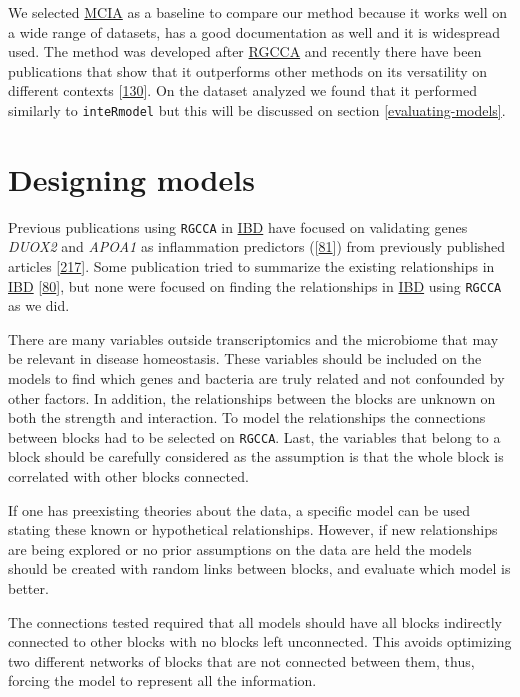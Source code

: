 \documentclass[
  12pt,
  a4paper,
  twoside,
  openright]{book}
\begin{document}
We selected \protect\hyperlink{acronyms_MCIA}{MCIA} as a baseline to compare our method because it works well on a wide range of datasets, has a good documentation as well and it is widespread used.
The method was developed after \protect\hyperlink{acronyms_RGCCA}{RGCCA} and recently there have been publications that show that it outperforms other methods on its versatility on different contexts {[}\protect\hyperlink{ref-cantini2021}{130}{]}.
On the dataset analyzed we found that it performed similarly to \texttt{inteRmodel} but this will be discussed on section \ref{evaluating-models}.

\hypertarget{designing-models}{%
\section{Designing models}\label{designing-models}}

Previous publications using \texttt{RGCCA} in \protect\hyperlink{acronyms_IBD}{IBD} have focused on validating genes \emph{DUOX2} and \emph{APOA1} as inflammation predictors ({[}\protect\hyperlink{ref-tang2017}{81}{]}) from previously published articles {[}\protect\hyperlink{ref-haberman2014}{217}{]}.
Some publication tried to summarize the existing relationships in \protect\hyperlink{acronyms_IBD}{IBD} {[}\protect\hyperlink{ref-hasler_uncoupling_2016}{80}{]}, but none were focused on finding the relationships in \protect\hyperlink{acronyms_IBD}{IBD} using \texttt{RGCCA} as we did.

There are many variables outside transcriptomics and the microbiome that may be relevant in disease homeostasis.
These variables should be included on the models to find which genes and bacteria are truly related and not confounded by other factors.
In addition, the relationships between the blocks are unknown on both the strength and interaction.
To model the relationships the connections between blocks had to be selected on \texttt{RGCCA}.
Last, the variables that belong to a block should be carefully considered as the assumption is that the whole block is correlated with other blocks connected.

If one has preexisting theories about the data, a specific model can be used stating these known or hypothetical relationships.
However, if new relationships are being explored or no prior assumptions on the data are held the models should be created with random links between blocks, and evaluate which model is better.

The connections tested required that all models should have all blocks indirectly connected to other blocks with no blocks left unconnected.
This avoids optimizing two different networks of blocks that are not connected between them, thus, forcing the model to represent all the information.
\end{document}
